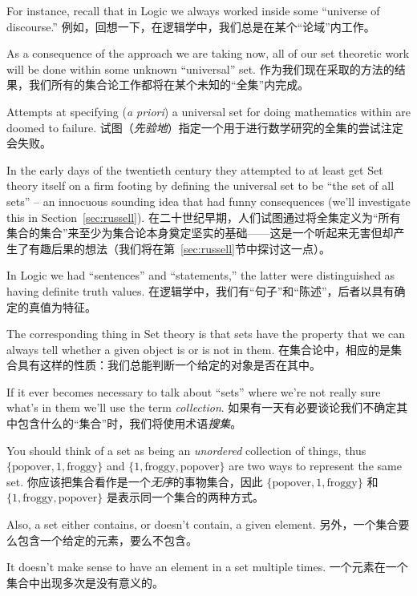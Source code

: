 For instance,
recall that in Logic we always worked inside some 
``universe of discourse.''
例如，回想一下，在逻辑学中，我们总是在某个“论域”内工作。

As a consequence of the approach we are taking now, all of our set theoretic
work will be done within some unknown 
``universal'' set.
作为我们现在采取的方法的结果，我们所有的集合论工作都将在某个未知的“全集”内完成。

Attempts at 
specifying (\emph{a priori}) a universal set for doing mathematics within 
are doomed to failure.
试图（\emph{先验地}）指定一个用于进行数学研究的全集的尝试注定会失败。

In the early days of the twentieth century
they attempted to at least get Set theory itself on a firm footing by
defining the universal set to be ``the set of all sets'' -- an innocuous
sounding idea that had funny consequences (we'll investigate this in 
Section~\ref{sec:russell}).
在二十世纪早期，人们试图通过将全集定义为“所有集合的集合”来至少为集合论本身奠定坚实的基础——这是一个听起来无害但却产生了有趣后果的想法（我们将在第~\ref{sec:russell}节中探讨这一点）。

In Logic we had ``sentences'' and ``statements,'' the latter were 
distinguished as having definite truth values.
在逻辑学中，我们有“句子”和“陈述”，后者以具有确定的真值为特征。

The corresponding
thing in Set theory is that sets have the property that we can always
tell whether a given object is or is not in them.
在集合论中，相应的是集合具有这样的性质：我们总能判断一个给定的对象是否在其中。

If it ever becomes
necessary to talk about ``sets'' where we're not really sure what's in
them we'll use the term \emph{collection}.
如果有一天有必要谈论我们不确定其中包含什么的“集合”时，我们将使用术语\emph{搜集}。

You should think of a set as being an \emph{unordered} collection of 
things, thus $\{ \mbox{popover}, 1, \mbox{froggy} \}$ and  
$\{ 1, \mbox{froggy}, \mbox{popover} \}$ are two ways to represent the 
same set.
你应该把集合看作是一个\emph{无序}的事物集合，因此 $\{ \mbox{popover}, 1, \mbox{froggy} \}$ 和 $\{ 1, \mbox{froggy}, \mbox{popover} \}$ 是表示同一个集合的两种方式。

Also, a set either contains, or doesn't contain, a given element.
另外，一个集合要么包含一个给定的元素，要么不包含。

It doesn't make sense to have an element in a set multiple times.
一个元素在一个集合中出现多次是没有意义的。

